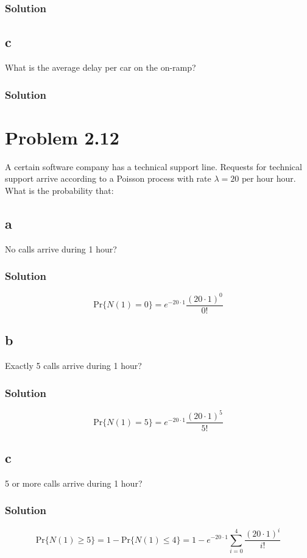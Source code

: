 \documentclass[letterpaper]{amsart}
\begin{document}
\subsubsection*{Solution}
\subsection*{c}
What is the average delay per car on the on-ramp?
\subsubsection*{Solution}

\section{Problem 2.12} %
A certain software company has a technical support line. Requests for
technical support arrive according to a Poisson process with rate
$\lambda=20\text{ per hour}$ hour. What is the probability that:
\subsection*{a}
No calls arrive during 1 hour?
\subsubsection*{Solution}
\begin{equation}
\text{Pr}\{N(1)=0\}=e^{-20\cdot 1}\frac{(20\cdot 1)^0}{0!}
\end{equation}
\subsection*{b}
Exactly 5 calls arrive during 1 hour?
\subsubsection*{Solution}
\begin{equation}
\text{Pr}\{N(1)=5\}=e^{-20\cdot 1}\frac{(20\cdot 1)^5}{5!}
\end{equation}
\subsection*{c}
5 or more calls arrive during 1 hour?
\subsubsection*{Solution}
\begin{equation}
\text{Pr}\{N(1)\geq 5\}=
1 - \text{Pr}\{N(1)\leq 4\}=
1-e^{-20\cdot 1}\sum_{i=0}^4\frac{(20\cdot 1)^i}{i!}
\end{equation}
\end{document}
